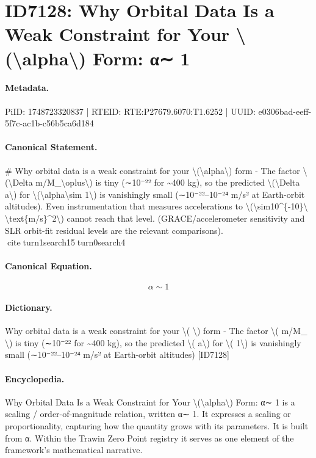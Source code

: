 \section*{ID7128: Why Orbital Data Is a Weak Constraint for Your \textbackslash{}(\textbackslash{}alpha\textbackslash{}) Form: α∼ 1}
\paragraph{Metadata.}
PiID: 1748723320837 | RTEID: RTE:P27679.6070:T1.6252 | UUID: e0306bad-eeff-5f7c-ac1b-c56b5ca6d184

\paragraph{Canonical Statement.}
\# Why orbital data is a weak constraint for your \textbackslash{}(\textbackslash{}alpha\textbackslash{}) form - The factor \textbackslash{}(\textbackslash{}Delta m/M\_\textbackslash{}oplus\textbackslash{}) is tiny (∼10⁻²² for \textasciitilde{}400 kg), so the predicted \textbackslash{}(\textbackslash{}Delta a\textbackslash{}) for \textbackslash{}(\textbackslash{}alpha\textbackslash{}sim 1\textbackslash{}) is vanishingly small (∼10⁻²²–10⁻²⁴ m/s² at Earth-orbit altitudes). Even instrumentation that measures accelerations to \textbackslash{}(\textbackslash{}sim10\textasciicircum{}\{-10\}\textbackslash{} \textbackslash{}text\{m/s\}\textasciicircum{}2\textbackslash{}) cannot reach that level. (GRACE/accelerometer sensitivity and SLR orbit-fit residual levels are the relevant comparisons). citeturn1search15turn0search4

\paragraph{Canonical Equation.}
\[
\alpha\sim 1
\]

\paragraph{Dictionary.}
Why orbital data is a weak constraint for your \textbackslash{}( \textbackslash{}) form - The factor \textbackslash{}( m/M\_ \textbackslash{}) is tiny (∼10⁻²² for \textasciitilde{}400 kg), so the predicted \textbackslash{}( a\textbackslash{}) for \textbackslash{}( 1\textbackslash{}) is vanishingly small (∼10⁻²²–10⁻²⁴ m/s² at Earth-orbit altitudes) [ID7128]

\paragraph{Encyclopedia.}
Why Orbital Data Is a Weak Constraint for Your \textbackslash{}(\textbackslash{}alpha\textbackslash{}) Form: α∼ 1 is a scaling / order-of-magnitude relation, written α∼ 1. It expresses a scaling or proportionality, capturing how the quantity grows with its parameters. It is built from α. Within the Trawin Zero Point registry it serves as one element of the framework's mathematical narrative.
